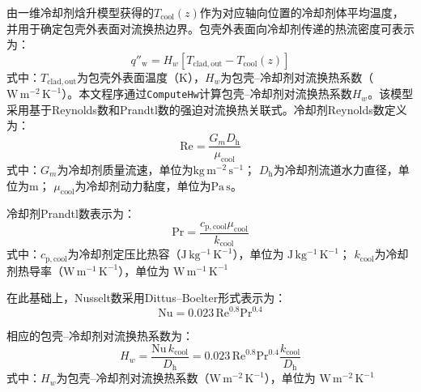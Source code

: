 \label{subsec:ch2_clad_coolant_bc}

由一维冷却剂{\rarecharfont 焓}升模型获得的$T_{\mathrm{cool}}(z)$作为对应轴向位置的冷却剂体平均温度，并用于确定包壳外表面对流换热边界。包壳外表面向冷却剂传递的热流密度可表示为：
\begin{equation}
	q''_{\mathrm w}
	=H_w
	\left[
	T_{\mathrm{clad,out}}-T_{\mathrm{cool}}(z)
	\right]
	\label{eq:ch2_clad_coolant_flux}
\end{equation}
\noindent 式中：$T_{\mathrm{clad,out}}$为包壳外表面温度（$\mathrm{K}$），$H_w$为包壳--冷却剂对流换热系数（$\mathrm{W\,m^{-2}\,K^{-1}}$）。本文程序通过\texttt{ComputeHw}计算包壳--冷却剂对流换热系数$H_w$。该模型采用基于Reynolds数和Prandtl数的强迫对流换热关联式。冷却剂Reynolds数定义为：
\begin{equation}
	\mathrm{Re}
	=
	\frac{G_m D_{\mathrm h}}{\mu_{\mathrm{cool}}}
	\label{eq:ch2_coolant_reynolds}
\end{equation}
\noindent 式中：$G_m$为冷却剂质量流速，单位为$\mathrm{kg\,m^{-2}\,s^{-1}}$；
$D_{\mathrm h}$为冷却剂流道水力直径，单位为$\mathrm{m}$；
$\mu_{\mathrm{cool}}$为冷却剂动力黏度，单位为$\mathrm{Pa\,s}$。

冷却剂Prandtl数表示为：
\begin{equation}
	\mathrm{Pr}
	=
	\frac{
		c_{\mathrm p,\mathrm{cool}}\mu_{\mathrm{cool}}
	}{
		k_{\mathrm{cool}}
	}
	\label{eq:ch2_coolant_prandtl}
\end{equation}
\noindent 式中：$c_{\mathrm p,\mathrm{cool}}$为冷却剂定压比热容（$\mathrm{J\,kg^{-1}\,K^{-1}}$），单位为
$\mathrm{J\,kg^{-1}\,K^{-1}}$；
$k_{\mathrm{cool}}$为冷却剂热导率（$\mathrm{W\,m^{-1}\,K^{-1}}$），单位为
$\mathrm{W\,m^{-1}\,K^{-1}}$

在此基础上，Nusselt数采用Dittus--Boelter形式表示为：
\begin{equation}
	\mathrm{Nu}
	=
	0.023\,
	\mathrm{Re}^{0.8}
	\mathrm{Pr}^{0.4}
	\label{eq:ch2_coolant_nusselt}
\end{equation}

相应的包壳--冷却剂对流换热系数为：
\begin{equation}
	H_w
	=
	\frac{\mathrm{Nu}\,k_{\mathrm{cool}}}{D_{\mathrm h}}
	=
	0.023\,
	\mathrm{Re}^{0.8}
	\mathrm{Pr}^{0.4}
	\frac{k_{\mathrm{cool}}}{D_{\mathrm h}}
	\label{eq:ch2_coolant_hw}
\end{equation}
\noindent 式中：$H_w$为包壳--冷却剂对流换热系数（$\mathrm{W\,m^{-2}\,K^{-1}}$），单位为
$\mathrm{W\,m^{-2}\,K^{-1}}$

